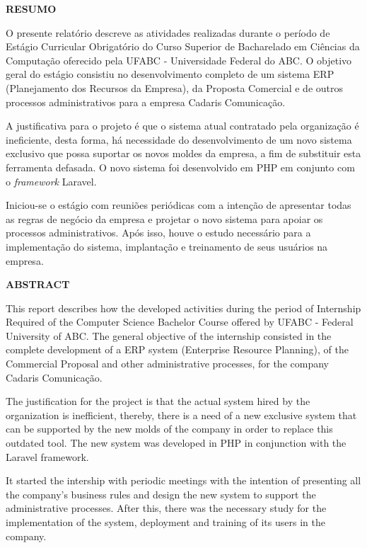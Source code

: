\documentclass[
  12pt,				%
  openany,
  oneside,
  a4paper,			%
  english,			%
  brazil
]{article}
\numberwithin{figure}{section}
\numberwithin{table}{section}
\begin{document}

\begin{titlepage}

\begin{center}
  \textbf{RESUMO}
\end{center}

O presente relatório descreve as atividades realizadas durante o período de Estágio Curricular Obrigatório do Curso Superior de Bacharelado em Ciências da Computação oferecido pela UFABC - Universidade Federal do ABC. O objetivo geral do estágio consistiu no desenvolvimento completo de um sistema ERP (Planejamento dos Recursos da Empresa), da Proposta Comercial e de outros processos administrativos para a empresa Cadaris Comunicação.

A justificativa para o projeto é que o sistema atual contratado pela organização é ineficiente, desta forma, há necessidade do desenvolvimento de um novo sistema exclusivo que possa suportar os novos moldes da empresa, a fim de substituir esta ferramenta defasada. O novo sistema foi desenvolvido em PHP em conjunto com o \textit{framework} Laravel.

Iniciou-se o estágio com reuniões periódicas com a intenção de apresentar todas as regras de negócio da empresa e projetar o novo sistema para apoiar os processos administrativos. Após isso, houve o estudo necessário para a implementação do sistema, implantação e treinamento de seus usuários na empresa.

\end{titlepage}


\begin{titlepage}

\begin{center}
  \textbf{ABSTRACT}
\end{center}

This report describes how the developed activities during the period of Internship Required of the Computer Science Bachelor Course offered by UFABC - Federal University of ABC. The general objective of the internship consisted in the complete development of a ERP system (Enterprise Resource Planning), of the Commercial Proposal and other administrative processes, for the company Cadaris Comunicação.

The justification for the project is that the actual system hired by the organization is inefficient, thereby, there is a need of a new exclusive system that can be supported by the new molds of the company in order to replace this outdated tool. The new system was developed in PHP in conjunction with the Laravel framework.

It started the intership with periodic meetings with the intention of presenting all the company's business rules and design the new system to support the administrative processes. After this, there was the necessary study for the implementation of the system, deployment and training of its users in the company.

\end{titlepage}
\end{document}

